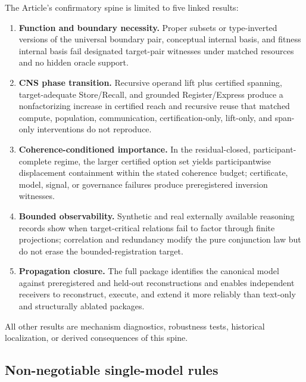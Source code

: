 \documentclass[11pt]{article}
\begin{document}
The Article's confirmatory spine is limited to five linked results:
\begin{enumerate}
\item \textbf{Function and boundary necessity.} Proper subsets or type-inverted versions of the universal boundary pair, conceptual internal basis, and fitness internal basis fail designated target-pair witnesses under matched resources and no hidden oracle support.
\item \textbf{CNS phase transition.} Recursive operand lift plus certified spanning, target-adequate Store/Recall, and grounded Register/Express produce a nonfactorizing increase in certified reach and recursive reuse that matched compute, population, communication, certification-only, lift-only, and span-only interventions do not reproduce.
\item \textbf{Coherence-conditioned importance.} In the residual-closed, participant-complete regime, the larger certified option set yields participantwise displacement containment within the stated coherence budget; certificate, model, signal, or governance failures produce preregistered inversion witnesses.
\item \textbf{Bounded observability.} Synthetic and real externally available reasoning records show when target-critical relations fail to factor through finite projections; correlation and redundancy modify the pure conjunction law but do not erase the bounded-registration target.
\item \textbf{Propagation closure.} The full package identifies the canonical model against preregistered and held-out reconstructions and enables independent receivers to reconstruct, execute, and extend it more reliably than text-only and structurally ablated packages.
\end{enumerate}
All other results are mechanism diagnostics, robustness tests, historical localization, or derived consequences of this spine.

\subsection{Non-negotiable single-model rules}
\end{document}
